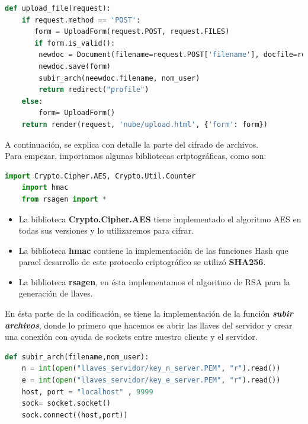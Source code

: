 \begin{lstlisting}[language=Python,frame=single, keywordstyle=\color{blue},breaklines=true]
def upload_file(request):
	if request.method == 'POST':
	   form = UploadForm(request.POST, request.FILES)
	   if form.is_valid():
		newdoc = Document(filename=request.POST['filename'], docfile=request.FILES['docfile'])
		newdoc.save(form)
		subir_arch(neewdoc.filename, nom_user)
		return redirect("profile")
	else:
		form= UploadForm()
	return render(request, 'nube/upload.html', {'form': form})
\end{lstlisting}



A continuación, se explica con detalle la parte del cifrado de archivos. \\
Para empezar, importamos algunas bibliotecas criptográficas, como son:

\begin{lstlisting}[language=Python,frame=single, keywordstyle=\color{blue},breaklines=true]
	import Crypto.Cipher.AES, Crypto.Util.Counter
	import hmac
	from rsagen import *
\end{lstlisting}


\begin{itemize}
	\item  La biblioteca \textbf{Crypto.Cipher.AES} tiene implementado el algoritmo AES en todas sus versiones y lo utilizaremos para cifrar.
	\item  La biblioteca \textbf{hmac} contiene la implementación de las funciones Hash que parael desarrollo de este protocolo criptográfico se utilizó \textbf{SHA256}.
	\item La biblioteca \textbf{rsagen}, en ésta implementamos el algoritmo de RSA para la generación de llaves.

\end{itemize}



En ésta parte de la codificación, se tiene la implementación de la función \textbf{\textit{subir archivos}}, donde lo primero que hacemos es abrir las llaves del servidor y crear una conexión con ayuda de sockets entre nuestro cliente y el servidor.
		
\begin{lstlisting}[language=Python,frame=single, keywordstyle=\color{blue},breaklines=true]
def subir_arch(filename,nom_user):
    n = int(open("llaves_servidor/key_n_server.PEM", "r").read())
    e = int(open("llaves_servidor/key_e_server.PEM", "r").read())
    host, port = "localhost" , 9999
    sock= socket.socket()
    sock.connect((host,port))
\end{lstlisting}


